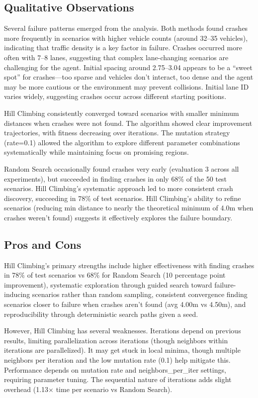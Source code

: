 \documentclass[11pt,a4paper]{article}
\begin{document}
\subsection{Qualitative Observations}

Several failure patterns emerged from the analysis. Both methods found crashes more frequently in scenarios with higher vehicle counts (around 32--35 vehicles), indicating that traffic density is a key factor in failure. Crashes occurred more often with 7--8 lanes, suggesting that complex lane-changing scenarios are challenging for the agent. Initial spacing around 2.75--3.04 appears to be a ``sweet spot'' for crashes---too sparse and vehicles don't interact, too dense and the agent may be more cautious or the environment may prevent collisions. Initial lane ID varies widely, suggesting crashes occur across different starting positions.

Hill Climbing consistently converged toward scenarios with smaller minimum distances when crashes were not found. The algorithm showed clear improvement trajectories, with fitness decreasing over iterations. The mutation strategy (rate=0.1) allowed the algorithm to explore different parameter combinations systematically while maintaining focus on promising regions.

Random Search occasionally found crashes very early (evaluation 3 across all experiments), but succeeded in finding crashes in only 68\% of the 50 test scenarios. Hill Climbing's systematic approach led to more consistent crash discovery, succeeding in 78\% of test scenarios. Hill Climbing's ability to refine scenarios (reducing min distance to nearly the theoretical minimum of 4.0m when crashes weren't found) suggests it effectively explores the failure boundary.

\subsection{Pros and Cons}

Hill Climbing's primary strengths include higher effectiveness with finding crashes in 78\% of test scenarios vs 68\% for Random Search (10 percentage point improvement), systematic exploration through guided search toward failure-inducing scenarios rather than random sampling, consistent convergence finding scenarios closer to failure when crashes aren't found (avg 4.00m vs 4.50m), and reproducibility through deterministic search paths given a seed.

However, Hill Climbing has several weaknesses. Iterations depend on previous results, limiting parallelization across iterations (though neighbors within iterations are parallelized). It may get stuck in local minima, though multiple neighbors per iteration and the low mutation rate (0.1) help mitigate this. Performance depends on mutation rate and neighbors\_per\_iter settings, requiring parameter tuning. The sequential nature of iterations adds slight overhead (1.13$\times$ time per scenario vs Random Search).
\end{document}
